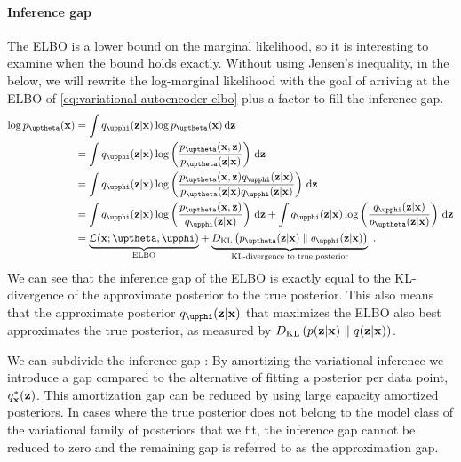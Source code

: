\paragraph{Inference gap} 
The ELBO is a lower bound on the marginal likelihood, so it is interesting to examine when the bound holds exactly. 
Without using Jensen's inequality, in the below, we will rewrite the log-marginal likelihood with the goal of arriving at the ELBO of \cref{eq:variational-autoencoder-elbo} plus a factor to fill the inference gap. 
%
\begin{align}
    \log p_\thetab(\xb) 
    &= \int q_\phib(\zb|\xb) \log p_\thetab(\xb) \, \textrm{d}\zb \nonumber \\
    &= \int q_\phib(\zb|\xb) \log \left(\frac{p_\thetab(\xb,\zb)}{p_\thetab(\zb|\xb)}\right) \, \textrm{d}\zb \nonumber \\
    &= \int q_\phib(\zb|\xb) \log \left(\frac{p_\thetab(\xb,\zb) q_\phib(\zb|\xb)}{p_\thetab(\zb|\xb) q_\phib(\zb|\xb)}\right) \, \textrm{d}\zb \nonumber \\
    &= \int q_\phib(\zb|\xb) \log \left(\frac{p_\thetab(\xb,\zb)}{q_\phib(\zb|\xb)}\right) \, \textrm{d}\zb + \int q_\phib(\zb|\xb) \log \left(\frac{q_\phib(\zb|\xb)}{p_\thetab(\zb|\xb)}\right) \, \textrm{d}\zb \nonumber \\
    &=
    \underset{\text{ELBO}}{\underbrace{
        \mathcal{L}_{}(\xb;\thetab,\phib)
    }} 
    + 
    \underset{\text{KL-divergence to true posterior}}{\underbrace{
        \vphantom{\mathcal{L}_{}(\xb;\thetab,\phib)}{D_\mathrm{KL}\left( p_\thetab(\zb|\xb) \parallel q_\phib(\zb|\xb) \right)}
    }} \enspace .
\end{align}
%
We can see that the inference gap of the ELBO is exactly equal to the KL-divergence of the approximate posterior to the true posterior. 
This also means that the approximate posterior $q_\phib(\zb|\xb)$ that maximizes the ELBO also best approximates the true posterior, as measured by $D_\mathrm{KL}\left( p({\mathbf{z}}|{\mathbf{x}}) \parallel q({\mathbf{z}}|{\mathbf{x}}) \right)$. 

We can subdivide the inference gap \cite{cremer_inference_2018}: 
By amortizing the variational inference we introduce a gap compared to the alternative of fitting a posterior per data point, $q^{*}_{{\mathbf{x}}}({\mathbf{z}})$. This amortization gap can be reduced by using large capacity amortized posteriors. 
In cases where the true posterior does not belong to the model class of the variational family of posteriors that we fit, the inference gap cannot be reduced to zero and the remaining gap is referred to as the approximation gap. 

